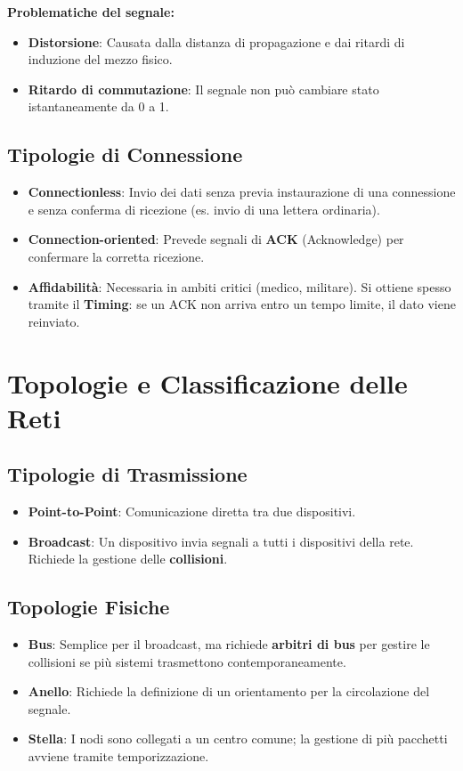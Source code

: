 \documentclass[12pt,a4paper,oneside]{book}
\begin{document}
\textbf{Problematiche del segnale:}
\begin{itemize}
    \item \textbf{Distorsione}: Causata dalla distanza di propagazione e dai ritardi di induzione del mezzo fisico.
    \item \textbf{Ritardo di commutazione}: Il segnale non può cambiare stato istantaneamente da 0 a 1.
\end{itemize}

\subsection{Tipologie di Connessione}
\begin{itemize}
    \item \textbf{Connectionless}: Invio dei dati senza previa instaurazione di una connessione e senza conferma di ricezione (es. invio di una lettera ordinaria).
    \item \textbf{Connection-oriented}: Prevede segnali di \textbf{ACK} (Acknowledge) per confermare la corretta ricezione.
    \item \textbf{Affidabilità}: Necessaria in ambiti critici (medico, militare). Si ottiene spesso tramite il \textbf{Timing}: se un ACK non arriva entro un tempo limite, il dato viene reinviato.
\end{itemize}

\section{Topologie e Classificazione delle Reti}

\subsection{Tipologie di Trasmissione}
\begin{itemize}
    \item \textbf{Point-to-Point}: Comunicazione diretta tra due dispositivi.
    \item \textbf{Broadcast}: Un dispositivo invia segnali a tutti i dispositivi della rete. Richiede la gestione delle \textbf{collisioni}.
\end{itemize}

\subsection{Topologie Fisiche}
\begin{itemize}
    \item \textbf{Bus}: Semplice per il broadcast, ma richiede \textbf{arbitri di bus} per gestire le collisioni se più sistemi trasmettono contemporaneamente.
    \item \textbf{Anello}: Richiede la definizione di un orientamento per la circolazione del segnale.
    \item \textbf{Stella}: I nodi sono collegati a un centro comune; la gestione di più pacchetti avviene tramite temporizzazione.
\end{itemize}
\end{document}
